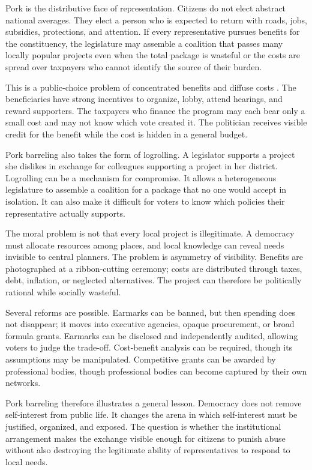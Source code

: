 ﻿\documentclass[12pt,a4paper]{book}
\begin{document}
Pork is the distributive face of representation.  Citizens do not elect
abstract national averages.  They elect a person who is expected to return
with roads, jobs, subsidies, protections, and attention.  If every
representative pursues benefits for the constituency, the legislature may
assemble a coalition that passes many locally popular projects even when the
total package is wasteful or the costs are spread over taxpayers who cannot
identify the source of their burden.

This is a public-choice problem of concentrated benefits and diffuse costs
\cite{Olson1965,BuchananTullock1962}.
The beneficiaries have strong incentives to organize, lobby, attend
hearings, and reward supporters.  The taxpayers who finance the program may
each bear only a small cost and may not know which vote created it.  The
politician receives visible credit for the benefit while the cost is hidden
in a general budget.

Pork barreling also takes the form of logrolling.  A legislator supports a
project she dislikes in exchange for colleagues supporting a project in her
district.  Logrolling can be a mechanism for compromise.  It allows a
heterogeneous legislature to assemble a coalition for a package that no one
would accept in isolation.  It can also make it difficult for voters to know
which policies their representative actually supports.

The moral problem is not that every local project is illegitimate.  A
democracy must allocate resources among places, and local knowledge can
reveal needs invisible to central planners.  The problem is asymmetry of
visibility.  Benefits are photographed at a ribbon-cutting ceremony; costs
are distributed through taxes, debt, inflation, or neglected alternatives.
The project can therefore be politically rational while socially wasteful.

Several reforms are possible.  Earmarks can be banned, but then spending
does not disappear; it moves into executive agencies, opaque procurement,
or broad formula grants.  Earmarks can be disclosed and independently
audited, allowing voters to judge the trade-off.  Cost-benefit analysis can
be required, though its assumptions may be manipulated.  Competitive
grants can be awarded by professional bodies, though professional bodies can
become captured by their own networks.

Pork barreling therefore illustrates a general lesson.  Democracy does not
remove self-interest from public life.  It changes the arena in which
self-interest must be justified, organized, and exposed.  The question is
whether the institutional arrangement makes the exchange visible enough for
citizens to punish abuse without also destroying the legitimate ability of
representatives to respond to local needs.
\end{document}
